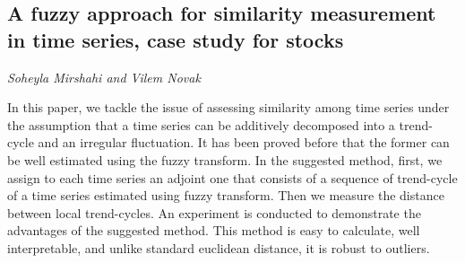 \documentclass[../booklet.tex]{subfiles}
\begin{document}
\subsection[A fuzzy approach for similarity measurement in time series, case study for stocks. {\it Soheyla Mirshahi and Vilem Novak}]{A fuzzy approach for similarity measurement in time series, case study for stocks}
 

\begin{center}
  {\it Soheyla Mirshahi and Vilem Novak}
\end{center}



 
In this paper, we tackle the issue of assessing similarity among time series under the assumption that a time series can be additively decomposed into a trend-cycle and an irregular fluctuation.  It has been proved before that the former can be well estimated using the fuzzy transform. In the suggested method, first, we assign to each time series an adjoint one that consists of a sequence of trend-cycle of a time series estimated using fuzzy transform. Then we measure the distance between local trend-cycles. An experiment is conducted to demonstrate the advantages of the suggested method. This method is easy to calculate, well interpretable, and unlike standard euclidean distance, it is robust to outliers. 
\end{document}

